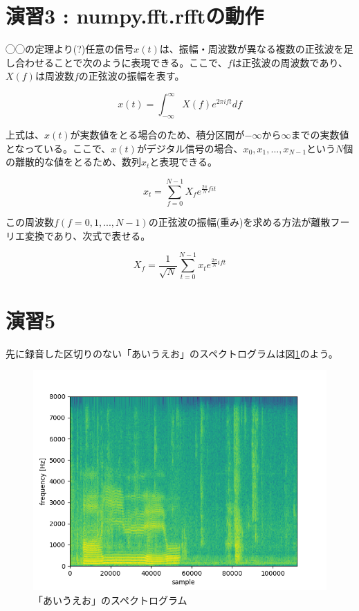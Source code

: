 \documentclass[a4paper,11pt]{jsarticle}
\begin{document}
\section{演習3 : numpy.fft.rfftの動作}
◯◯の定理より(?)任意の信号$x(t)$は、振幅・周波数が異なる複数の正弦波を足し合わせることで次のように表現できる。ここで、$f$は正弦波の周波数であり、$X(f)$は周波数$f$の正弦波の振幅を表す。

$$ x(t) = \int_{-\infty}^{\infty} X(f)e^{2\pi ift} df $$

上式は、$x(t)$が実数値をとる場合のため、積分区間が$-\infty$から$\infty$までの実数値となっている。ここで、$x(t)$がデジタル信号の場合、$x_0, x_1, ..., x_{N-1}$という$N$個の離散的な値をとるため、数列$x_t$と表現できる。

$$ x_t = \sum_{f=0}^{N-1} X_f e^{\frac{2\pi}{N}fit} $$

この周波数$f (f=0,1,...,N-1)$の正弦波の振幅(重み)を求める方法が離散フーリエ変換であり、次式で表せる。

$$ X_f = \frac{1}{\sqrt{N}} \sum_{t=0}^{N-1} x_t e^{\frac{2\pi}{N}ift} $$

\section{演習5}
先に録音した区切りのない「あいうえお」のスペクトログラムは図\ref{aiueo_spectrogram}のよう。

\begin{figure}[H]
  \centering
  \includegraphics[scale=0.5]{../ex05/plot-spectrogram.png}
  \caption{「あいうえお」のスペクトログラム}
  \label{aiueo_spectrogram}
\end{figure}
\end{document}
